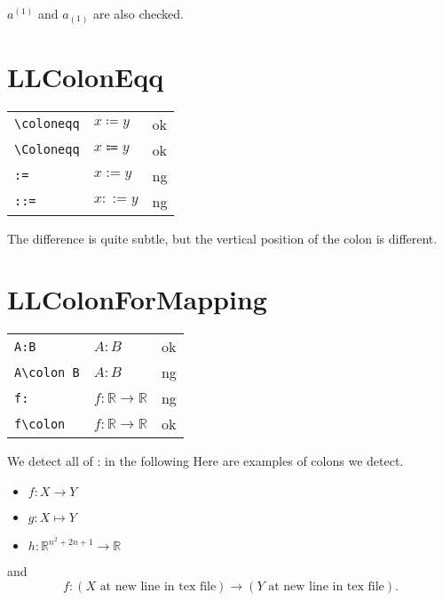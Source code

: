 \documentclass[a4paper]{article}
\newcommand{\tA}[1]{\textcolor{cA}{#1}}
\newcommand{\tD}[1]{\textcolor{cD}{#1}}
\begin{document}
$a^(1)$ and $a_(1)$ are also checked.


\section{LLColonEqq}

\begin{table}[H]
	\centering
	\begin{tabular}{lll}
		\verb|\coloneqq| & $x\coloneqq y$ & \tA{ok} \\
		\verb|\Coloneqq| & $x\Coloneqq y$ & \tA{ok} \\
		\verb|:=|        & $x:= y$        & \tD{ng} \\
		\verb|::=|       & $x::= y$       & \tD{ng}
	\end{tabular}
\end{table}

The difference is quite subtle, but the vertical position of the colon is different.

\section{LLColonForMapping}

\begin{table}[H]
	\centering
	\begin{tabular}{lll}
		\verb|A:B|       & $A:B$                               & \tA{ok} \\
		\verb|A\colon B| & $A\colon B$                         & \tD{ng} \\
		\verb|f:|        & $f:\mathbb{R} \to \mathbb{R}$       & \tD{ng} \\
		\verb|f\colon|   & $f\colon \mathbb{R} \to \mathbb{R}$ & \tA{ok}
	\end{tabular}
\end{table}

\begin{itembox}{We detect all of : in the following}
	Here are examples of colons we detect.
	\begin{itemize}
		\item $f:X \to Y$
		\item \( g: X \mapsto Y \)
		\item $h : \mathbb{R}^{n^2 + 2n + 1} \rightarrow \mathbb{R}$
	\end{itemize}
	and
	\begin{equation} \label{eq:sample}
		f:
		(X \text{ at new line in tex file})
		\to
		(Y \text{ at new line in tex file}).
	\end{equation}
\end{itembox}
\end{document}
